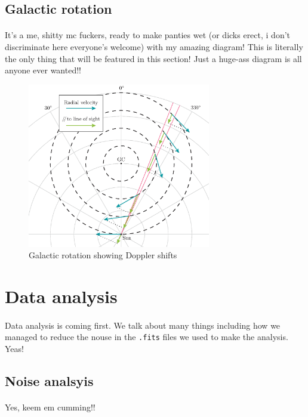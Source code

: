 \documentclass[a4paper, titlepage, oneside]{article}
\begin{document}
\begin{multicols}{2}
\subsection{Galactic rotation}
\paragraph{}
It's a me, shitty mc fuckers, ready to make panties wet (or dicks erect, i don't discriminate here everyone's welcome) with my amazing diagram! This is literally the only thing that will be featured in this section! Just a huge-ass diagram is all anyone ever wanted!!

\begin{figure}[H]
  \centering
  \includegraphics[width = 8cm]{figures/galactic-rotation}
  \caption{Galactic rotation showing Doppler shifts}
  \label{fig:gal-rot}
\end{figure}

\section{Data analysis}
\paragraph{}
Data analysis is coming first. We talk about many things including how we managed to reduce the nouse in the \texttt{.fits} files we used to make the analysis. Yeas!

\subsection{Noise analsyis}
\paragraph{}
Yes, keem em cumming!!


\end{multicols}
\end{document}
